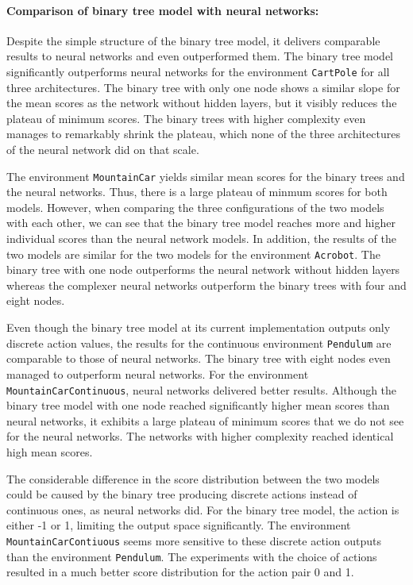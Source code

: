 \paragraph*{Comparison of binary tree model with neural networks:} Despite the simple structure of the binary tree model, it delivers comparable results to neural networks and even outperformed them. The binary tree model significantly outperforms neural networks for the environment \verb|CartPole| for all three architectures. The binary tree with only one node shows a similar slope for the mean scores as the network without hidden layers, but it visibly reduces the plateau of minimum scores. The binary trees with higher complexity even manages to remarkably shrink the plateau, which none of the three architectures of the neural network did on that scale.

The environment \verb|MountainCar| yields similar mean scores for the binary trees and the neural networks. Thus, there is a large plateau of minmum scores for both models. However, when comparing the three configurations of the two models with each other, we can see that the binary tree model reaches more and higher individual scores than the neural network models. In addition, the results of the two models are similar for the two models for the environment \verb|Acrobot|. The binary tree with one node outperforms the neural network without hidden layers whereas the complexer neural networks outperform the binary trees with four and eight nodes.

Even though the binary tree model at its current implementation outputs only discrete action values, the results for the continuous environment \verb|Pendulum| are comparable to those of neural networks. The binary tree with eight nodes even managed to outperform neural networks. For the environment \verb|MountainCarContinuous|, neural networks delivered better results. Although the binary tree model with one node reached significantly higher mean scores than neural networks, it exhibits a large plateau of minimum scores that we do not see for the neural networks. The networks with higher complexity reached identical high mean scores.

The considerable difference in the score distribution between the two models could be caused by the binary tree producing discrete actions instead of continuous ones, as neural networks did. For the binary tree model, the action is either -1 or 1, limiting the output space significantly. The environment \verb|MountainCarContiuous| seems more sensitive to these discrete action outputs than the environment \verb|Pendulum|. The experiments with the choice of actions resulted in a much better score distribution for the action pair 0 and 1.

